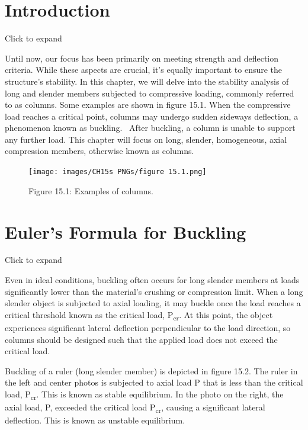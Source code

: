 \documentclass[
  letterpaper,
  DIV=11,
  numbers=noendperiod]{scrreprt}
\begin{document}
\section*{Introduction}\label{introduction-15}


Click to expand

Until now, our focus has been primarily on meeting strength and
deflection criteria. While these aspects are crucial, it's equally
important to ensure the structure's stability. In this chapter, we will
delve into the stability analysis of long and slender members subjected
to compressive loading, commonly referred to as columns. Some examples
are shown in figure 15.1. When the compressive load reaches a critical
point, columns may undergo sudden sideways deflection, a phenomenon
known as buckling.~ After buckling, a column is unable to support any
further load. This chapter will focus on long, slender, homogeneous,
axial compression members, otherwise known as columns.

\begin{figure}[H]

{\centering \texttt{[image: images/CH15s PNGs/figure 15.1.png]}

}

\caption{Figure 15.1: Examples of columns.}

\end{figure}%

\section{Euler's Formula for
Buckling}\label{eulers-formula-for-buckling}

Click to expand

Even in ideal conditions, buckling often occurs for long slender members
at loads significantly lower than the material's crushing or compression
limit. When a long slender object is subjected to axial loading, it may
buckle once the load reaches a critical threshold known as the critical
load, P\textsubscript{cr}. At this point, the object experiences
significant lateral deflection perpendicular to the load direction, so
columns should be designed such that the applied load does not exceed
the critical load.

Buckling of a ruler (long slender member) is depicted in figure 15.2.
The ruler in the left and center photos is subjected to axial load P
that is less than the critical load, P\textsubscript{cr}. This is known
as stable equilibrium. In the photo on the right, the axial load, P,
exceeded the critical load P\textsubscript{cr}, causing a significant
lateral deflection. This is known as unstable equilibrium.
\end{document}
